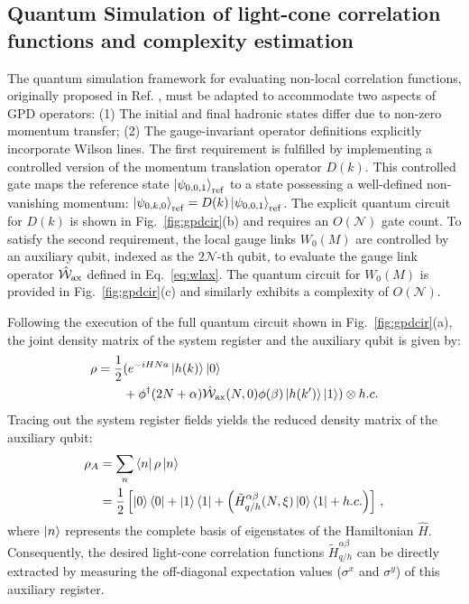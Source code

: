 \documentclass[aps,prd,twocolumn,superscriptaddress,notitlepage,nofootinbib,preprintnumbers]{revtex4-1}
\begin{document}
\subsection{Quantum Simulation of light-cone correlation functions and complexity estimation}
The quantum simulation framework for evaluating non-local correlation functions, originally proposed in Ref. \cite{Pedernales:2014izf}, must be adapted to accommodate two aspects of GPD operators:
(1) The initial and final hadronic states differ due to non-zero momentum transfer; (2) The gauge-invariant operator definitions explicitly incorporate Wilson lines.
The first requirement is fulfilled by implementing a controlled version of the momentum translation operator $D(k)$. 
This controlled gate maps the reference state $\ket{\psi_{0,0,1}}_{\rm ref}$ to a state possessing a well-defined non-vanishing momentum: $\ket{\psi_{0,k,0}}_{\rm ref} = D(k)\ket{\psi_{0,0,1}}_{\rm ref}$. The explicit quantum circuit for $D(k)$ is shown in Fig.~\ref{fig:gpdcir}(b) and requires an $O(\mathcal{N})$ gate count.
To satisfy the second requirement, the local gauge links $W_0(M)$ are controlled by an auxiliary qubit, indexed as the $2\mathcal{N}$-th qubit, to evaluate the gauge link operator $\hat{\mathcal{W}}_{\rm ax}$ defined in Eq.~\eqref{eq:wlax}.
The quantum circuit for $W_0(M)$ is provided in Fig.~\ref{fig:gpdcir}(c) and similarly exhibits a complexity of $O(\mathcal{N})$.

Following the execution of the full quantum circuit shown in Fig.~\ref{fig:gpdcir}(a), the joint density matrix of the system register and the auxiliary qubit is given by:
\begin{align}
    \rho =\frac{1}{2} & (e^{-iHNa}\ket{h(k)}\ket{0}\nonumber\\
    &+\phi^\dagger(2N+\alpha)\hat{\mathcal{W}}_{\rm ax}(N,0)\phi(\beta)\ket{h(k')}\ket{1}) \otimes h.c.
\end{align}
Tracing out the system register fields yields the reduced density matrix of the auxiliary qubit:
\begin{align}
    \rho_A &= \sum_n \bra{n} \rho \ket{n}\nonumber\\
    &= \frac{1}{2} \left[\ket{0} \bra{0}+\ket{1}\bra{1}+\left(\tilde{H}^{\alpha\beta}_{q/h}(N,\xi)\ket{0}\bra{1}+h.c.\right)\right]\,,
\end{align}
where $\ket{n}$ represents the complete basis of eigenstates of the Hamiltonian $\hat{H}$. Consequently, the desired light-cone correlation functions $\tilde{H}^{\alpha\beta}_{q/h}$ can be directly extracted by measuring the off-diagonal expectation values ($\sigma^x$ and $\sigma^y$) of this auxiliary register.
\end{document}
